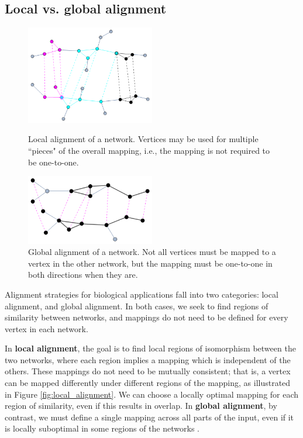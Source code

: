 \documentclass[12pt]{thesis}
\theoremstyle{plain}
\theoremstyle{definition}
\theoremstyle{remark}
\begin{document}
\subsection{Local vs. global alignment}

\renewcommand{\topfraction}{0.65}
\begin{figure}[!t]
\centering
\includegraphics[width=0.5\textwidth]{local_alignment.png}
\vspace{5pt}
\caption{Local alignment of a network. Vertices may be used for multiple ``pieces" of the overall mapping, i.e., the mapping is not required to be one-to-one.}
\label{fig:local_alignment}
\vspace{15pt}
\includegraphics[width=0.5\textwidth]{global_alignment.png}
\vspace{5pt}
\caption{Global alignment of a network. Not all vertices must be mapped to a vertex in the other network, but the mapping must be one-to-one in both directions when they are.}
\label{fig:global_alignment}
\end{figure}

Alignment strategies for biological applications fall into two categories: local alignment, and global alignment. In both cases, we seek to find regions of similarity between networks, and mappings do not need to be defined for every vertex in each network. 

In \textbf{local alignment}, the goal is to find local regions of isomorphism between the two networks, where each region implies a mapping which is independent of the others. These mappings do not need to be mutually consistent; that is, a vertex can be mapped differently under different regions of the mapping, as illustrated in Figure \ref{fig:local_alignment}. We can choose a locally optimal mapping for each region of similarity, even if this results in overlap. In \textbf{global alignment}, by contrast, we must define a single mapping across all parts of the input, even if it is locally suboptimal in some regions of the networks \cite{Singh_2007}. 
\end{document}
